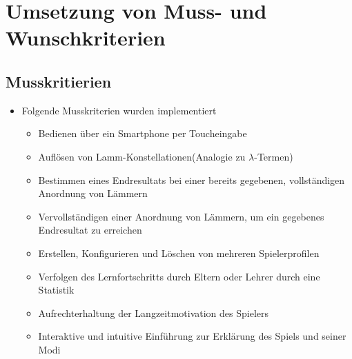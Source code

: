 \section{Umsetzung von Muss- und Wunschkriterien}

\subsection{Musskritierien}
\begin{itemize}
\item Folgende Musskriterien wurden implementiert
\begin{itemize} 
\item Bedienen über ein Smartphone per Toucheingabe
	\item Auflösen von Lamm-Konstellationen(Analogie zu $\lambda$-Termen)
	
		\item Bestimmen eines Endresultats bei einer bereits gegebenen, vollständigen Anordnung von Lämmern 
		\item Vervollständigen einer Anordnung von Lämmern, um ein gegebenes Endresultat zu erreichen
	
	\item Erstellen, Konfigurieren und Löschen von mehreren Spielerprofilen
	\item Verfolgen des Lernfortschritts durch Eltern oder Lehrer durch eine Statistik
	\item Aufrechterhaltung der Langzeitmotivation des Spielers
	\item Interaktive und intuitive Einführung zur Erklärung des Spiels und seiner Modi
	\end{itemize}
\end{itemize}

